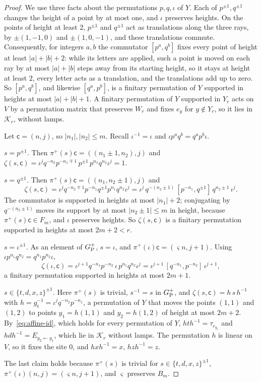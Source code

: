 \begin{proof}
We use three facts about the permutations $p,q,\iota$ of $Y$. Each of $p^{\pm1},q^{\pm1}$ changes the height of a point by at most one,
and $\iota$ preserves heights. On the points of height at least $2$, $p^{\pm1}$ and $q^{\pm1}$ act as translations along the three rays,
by $\pm(1,-1,0)$ and $\pm(1,0,-1)$, and these translations commute. Consequently, for integers $a,b$ the commutator $[p^a,q^b]$ fixes every
point of height at least $\lvert a\rvert+\lvert b\rvert+2$: while its letters are applied, such a point is moved on each ray by at most
$\lvert a\rvert+\lvert b\rvert$ steps away from its starting height, so it stays at height at least $2$, every letter acts as a
translation, and the translations add up to zero. So $[p^a,q^b]$, and likewise $[q^a,p^b]$, is a finitary permutation of $Y$ supported in
heights at most $\lvert a\rvert+\lvert b\rvert+1$. A finitary permutation of $Y$ supported in $Y_r$ acts on $V$ by a permutation matrix
that preserves $W_r$ and fixes $e_y$ for $y\notin Y_r$, so it lies in $\mathcal K_r$, without lamps.

Let $\mathsf c=(n,j)$, so $\lvert n_1\rvert,\lvert n_2\rvert\le m$. Recall $\iota^{-1}=\iota$ and $\iota p^aq^b=q^ap^b\iota$.

\emph{$s=p^{\pm1}$.} Then $\pi^+(s)\mathsf c=((n_1\pm1,n_2),j)$ and
$\zeta(s,\mathsf c)=\iota^jq^{-n_2}p^{-n_1\mp1}\,p^{\pm1}\,p^{n_1}q^{n_2}\iota^j=1$.

\emph{$s=q^{\pm1}$.} Then $\pi^+(s)\mathsf c=((n_1,n_2\pm1),j)$ and
\[
\zeta(s,\mathsf c)=\iota^jq^{-n_2\mp1}p^{-n_1}q^{\pm1}p^{n_1}q^{n_2}\iota^j=\iota^j\,q^{-(n_2\pm1)}\,[p^{-n_1},q^{\pm1}]\,q^{n_2\pm1}\,\iota^j .
\]
The commutator is supported in heights at most $\lvert n_1\rvert+2$; conjugating by $q^{-(n_2\pm1)}$ moves its support by at most
$\lvert n_2\pm1\rvert\le m$ in height, because $\pi^+(s)\mathsf c\in F_m$, and $\iota$ preserves heights. So $\zeta(s,\mathsf c)$ is a
finitary permutation supported in heights at most $2m+2<r$.

\emph{$s=\iota^{\pm1}$.} As an element of $G_{\mathrm P}^{+}$, $s=\iota$, and $\pi^+(\iota)\mathsf c=(\varsigma n,j+1)$. Using $\iota
p^{n_1}q^{n_2}=q^{n_1}p^{n_2}\iota$,
\[
\zeta(\iota,\mathsf c)=\iota^{j+1}q^{-n_1}p^{-n_2}\,\iota\, p^{n_1}q^{n_2}\iota^j=\iota^{j+1}\,[q^{-n_1},p^{-n_2}]\,\iota^{j+1},
\]
a finitary permutation supported in heights at most $2m+1$.

\emph{$s\in\{t,d,x,z\}^{\pm1}$.} Here $\pi^+(s)$ is trivial, $s^{-1}=s$ in $G_{\mathrm P}^{+}$, and $\zeta(s,\mathsf c)=h\,s\,h^{-1}$ with
$h=g_{\mathsf c}^{-1}=\iota^jq^{-n_2}p^{-n_1}$, a permutation of $Y$ that moves the points $(1,1)$ and $(1,2)$ to points $y_1=h(1,1)$ and
$y_2=h(1,2)$ of height at most $2m+2$. By~\eqref{eq:affine-id}, which holds for every permutation of $Y$, $hth^{-1}=\tau_{e_{y_1}}$ and
$hdh^{-1}=E_{y_2\leftarrow y_1}$, which lie in $\mathcal K_r$ without lamps. The permutation $h$ is linear on $V$, so it fixes the site $0$,
and $hxh^{-1}=x$, $hzh^{-1}=z$.

The last claim holds because $\pi^+(s)$ is trivial for $s\in\{t,d,x,z\}^{\pm1}$, $\pi^+(\iota)(n,j)=(\varsigma n,j+1)$, and $\varsigma$
preserves $B_m$.
\end{proof}

